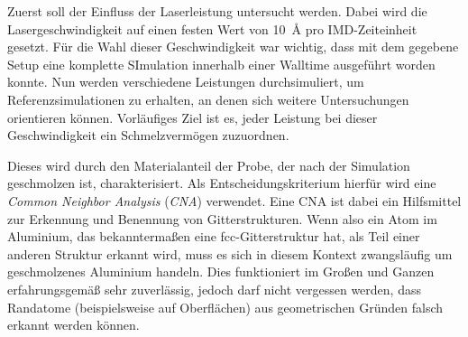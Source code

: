 		Zuerst soll der Einfluss der Laserleistung untersucht werden. Dabei wird die
		Lasergeschwindigkeit auf einen festen Wert von \SI{10}{\angstrom} pro IMD-Zeiteinheit
		gesetzt. Für die Wahl dieser Geschwindigkeit war wichtig, dass mit dem gegebene Setup eine
		komplette SImulation innerhalb einer Walltime ausgeführt worden konnte. Nun werden
		verschiedene Leistungen durchsimuliert, um Referenzsimulationen zu erhalten, an denen sich
		weitere Untersuchungen orientieren können. Vorläufiges Ziel ist es, jeder Leistung bei
		dieser Geschwindigkeit ein Schmelzvermögen zuzuordnen.

		Dieses wird durch den Materialanteil der Probe, der nach der Simulation geschmolzen ist,
		charakterisiert. Als Entscheidungskriterium hierfür wird eine
		\emph{Common Neighbor Analysis} (\emph{CNA}) verwendet. Eine CNA ist dabei ein Hilfsmittel
		zur Erkennung und Benennung von Gitterstrukturen. Wenn also ein Atom im Aluminium, das
		bekanntermaßen eine fcc-Gitterstruktur hat, als Teil einer anderen Struktur erkannt wird,
		muss es sich in diesem Kontext zwangsläufig um geschmolzenes Aluminium handeln. Dies
		funktioniert im Großen und Ganzen erfahrungsgemäß sehr zuverlässig, jedoch darf nicht
		vergessen werden, dass Randatome (beispielsweise auf Oberflächen) aus geometrischen
		Gründen falsch erkannt werden können.

